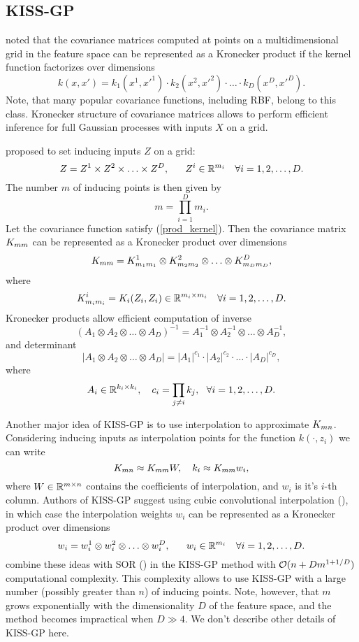 \subsection{KISS-GP}
\label{kiss_gp}

  \citet{saatci2012} noted that the covariance matrices computed at points on a
  multidimensional grid in the feature space can be represented as a Kronecker
  product if the kernel function factorizes over dimensions
  \begin{equation}
  \label{prod_kernel}
    k(x, x') = k_1(x^1, x'^1)\cdot k_2(x^2, x'^2)\cdot \ldots\cdot k_D(x^D, x'^D).
  \end{equation}
  Note, that many popular covariance functions, including RBF, belong to this class.
  Kronecker structure of covariance matrices allows to perform efficient inference
  for full Gaussian processes with inputs $X$ on a grid.

  \citet{wilson2015} proposed to set inducing inputs $Z$ on a grid:
  \[
    Z = Z^1 \times Z^2 \times \ldots \times Z^D,~~~~~Z^i \in \mathbb{R}^{m_i}~~~\forall i = 1, 2, \ldots, D.
  \]
  The number $m$  of inducing points is then given by
  \[
    m = \prod_{i=1}^D m_{i}.
  \]
  Let the covariance function satisfy (\ref{prod_kernel}). Then the covariance 
  matrix $K_{mm}$ can be represented as a Kronecker product over dimensions
  \[
    K_{mm} = K_{m_1 m_1}^1 \otimes K^2_{m_2 m_2} \otimes \ldots \otimes
    K^D_{m_D m_D},
  \]
  where
  \[
    K^i_{m_i m_i} = K_i(Z_i, Z_i) \in \mathbb{R}^{m_i \times m_i}~~~\forall i = 1, 2, \ldots, D.
  \]
  Kronecker products allow efficient computation of inverse
  \[
    (A_1 \otimes A_2 \otimes \ldots \otimes A_D)^{-1} = 
    A_1^{-1} \otimes A_2^{-1} \otimes \ldots \otimes A_D^{-1},
  \]
  and determinant
  \[
    |A_1 \otimes A_2 \otimes \ldots \otimes A_D| = |A_1|^{c_1} \cdot 
    |A_2|^{c_2} \cdot \ldots \cdot |A_D|^{c_D},
  \]
  where
  \[
    A_i\in\mathbb{R}^{k_i \times k_i},~~~c_i = \prod_{j \ne i} k_j,~~\forall i = 1, 2, \ldots, D.
  \]

  Another major idea of KISS-GP is to use interpolation to approximate $K_{mn}$.
  Considering inducing inputs as interpolation points for the function 
  $k(\cdot, z_i)$ we can write
  \begin{equation}
  \label{kernel_interpolation}
    K_{mn} \approx K_{mm} W,~~~k_{i} \approx K_{mm} w_i,
  \end{equation}
  where $W \in \mathbb{R}^{m \times n}$ contains the coefficients of interpolation, and
  $w_i$ is it's $i$-th column. Authors of KISS-GP suggest using cubic 
  convolutional interpolation (\citet{keys1981}), in which case the interpolation
  weights $w_i$ can be represented as a Kronecker product over dimensions
  \[
    w_i = w_i^1 \otimes w_i^2 \otimes \ldots \otimes w_i^D,~~~~~w_i \in \mathbb{R}^{m_i}~~~\forall i = 1, 2, \ldots, D.
  \]
  \citet{wilson2015} combine these ideas with SOR (\citet{silverman1985})
  in the KISS-GP method with $\mathcal{O}(n + D m^{1 + 1/D})$ computational 
  complexity. This complexity allows to use KISS-GP with a large number (possibly 
  greater than $n$) of inducing points. Note, however, that $m$ grows 
  exponentially with the dimensionality $D$ of the feature space, and the
  method becomes impractical when $D \gg 4$. We don't describe other details of
  KISS-GP here.

